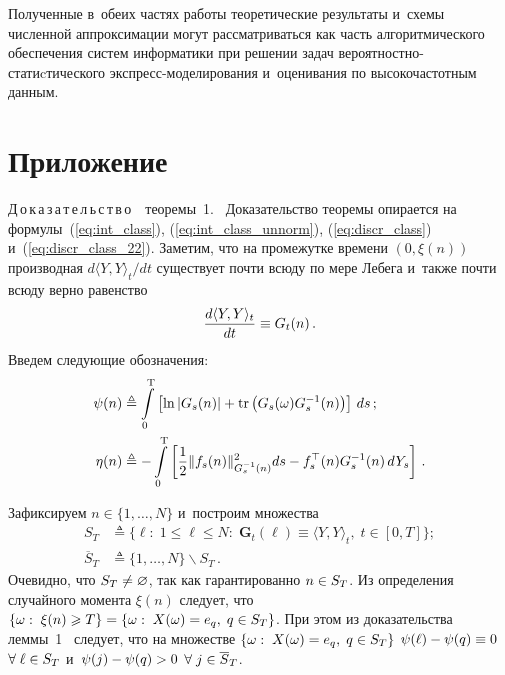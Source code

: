 \begin{multicols}{2}
  Полученные в~обеих частях работы теоретические результаты и~схемы 
  численной ап\-прок\-си\-мации могут рассматриваться как часть алгоритмического 
  обеспечения систем информатики при реше\-нии задач ве\-ро\-ят\-ност\-но-ста\-ти\-cти\-че\-ско\-го 
  экс\-пресс-мо\-де\-ли\-ро\-ва\-ния и~оценивания по вы\-со\-ко\-час\-тотным данным.

 {\small \section*{\raggedleft Приложение}


\noindent
Д\,о\,к\,а\,з\,а\,т\,е\,л\,ь\,с\,т\,в\,о\ \ 
теоремы~1.\ %
Доказательство теоремы опирается на формулы~(\ref{eq:int_class}), 
(\ref{eq:int_class_unnorm}), (\ref{eq:discr_class}) и~(\ref{eq:discr_class_22}).
 Заметим, что на промежутке времени $(0,\xi(n))$ 
 производная ${d\langle Y,Y\rangle_t}/{dt}$ существует почти всюду по мере Лебега
  и~также почти всюду верно равенство
 \begin{equation*}
 \displaystyle\frac{\displaystyle d\langle Y,Y\rangle_t\mathstrut}{\displaystyle dt\mathstrut} \equiv G_t(n)\,.
 \end{equation*}
 Введем следующие обозначения:
 \begin{align*}
 \psi(n) &\triangleq \displaystyle \int\limits_0^{\mathrm{T}} \left[ \ln|G_s(n)|+ \mathrm{tr}\left( 
 G_s(\omega) G_s^{-1}(n)\right)\right]\,ds\,;\\
 \displaystyle
 \eta(n) &\displaystyle\triangleq -\int\limits_0^{\mathrm{T}} \left[
\displaystyle\frac{\displaystyle 1\mathstrut}{\displaystyle 2\mathstrut}\|f_s(n)\|^2_{
  G_s^{-1}(n)}ds - f_s^{\top}(n)G_s^{-1}(n)\,dY_s
  \right]\,.
 \end{align*}

 Зафиксируем $n \in \{1,\ldots,N\}$ и~построим множества
 \begin{align*}
 S_T &\triangleq \{\ell: \; 1\leqslant \ell \leqslant N:\; 
 \mathbf{G}_t(\ell)\equiv \langle Y,Y\rangle_t, \; t \in [0,T] \}; \\
 \overline{S}_T &\triangleq \{1,\ldots,N\} \backslash S_T\,.
 \end{align*}
 Очевидно, что $S_T \hm\neq \varnothing$, так как гарантированно $n \hm\in S_T$. 
 Из определения случайного момента $\xi(n)$ следует, что $\{\omega:\; \xi(n) 
 \hm\geqslant T\} \hm=\{\omega:\; X(\omega)\hm=e_q,\; q \hm\in S_T\}$. При этом 
 из доказательства леммы~1~\cite{B_17} следует, что 
 на множестве $\{\omega:\; X(\omega)\hm=
 e_q,\; q\hm\in S_T\}$
 $\psi(\ell)\hm - \psi(q)\hm \equiv 0$ $\forall \; \ell \hm\in S_T$ и~$\psi(j)\hm - 
 \psi(q) \hm> 0$ $\forall \; j\hm \in \overline{S}_T$.

}
\end{multicols}
